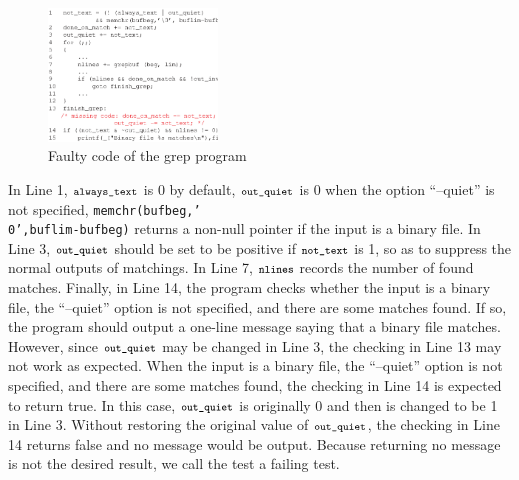 \documentclass{sig-alternate}
\newcommand{\CodeIn}[1]{{\small\texttt{#1}}}
\begin{document}
\begin{figure}[t]
\begin{center}
  \includegraphics[angle=0,width=0.4\textwidth]{figs/example11.eps}
  \centering
  \caption{Faulty code of the grep program}
  \label{fig:example1}
\end{center}
\end{figure}



In Line 1, $\CodeIn{always\_text}$ is 0 by default,
$\CodeIn{out\_quiet}$ is 0 when the option ``--quiet'' is not
specified, \CodeIn{memchr(bufbeg,'\\0',buflim-bufbeg)} returns a
non-null pointer if the input is a binary file. In Line 3,
$\CodeIn{out\_quiet}$ should be set to be positive if
$\CodeIn{not\_text}$ is 1, so as to suppress the normal outputs of
matchings. In Line 7, $\CodeIn{nlines}$ records the number of found
matches. Finally, in Line 14, the program checks whether the input
is a binary file, the ``--quiet'' option is not specified, and there
are some matches found. If so, the program should output a one-line
message saying that a binary file matches. However, since
$\CodeIn{out\_quiet}$ may be changed in Line 3, the checking in Line
13 may not work as expected. When the input is a binary file, the
``--quiet'' option is not specified, and there are some matches
found, the checking in Line 14 is expected to return true. In this
case, $\CodeIn{out\_quiet}$ is originally 0 and then is changed to
be 1 in Line 3. Without restoring the original value of
$\CodeIn{out\_quiet}$, the checking in Line 14 returns false and no
message would be output. Because returning no message is not the
desired result, we call the test a failing test.
\end{document}
